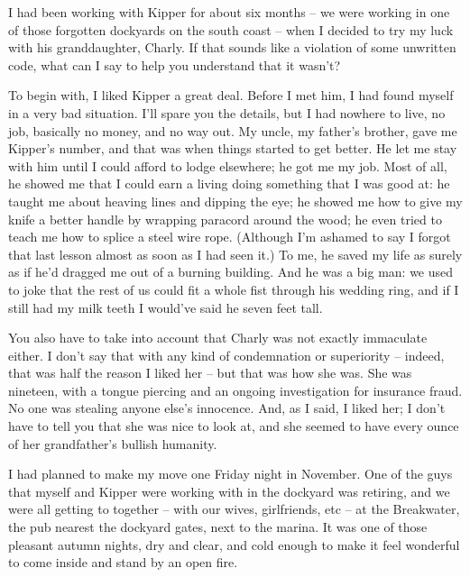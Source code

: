 

I had been working with Kipper for about six months -- we were working in one of those forgotten dockyards on the south coast -- when I decided to try my luck with his granddaughter, Charly. If that sounds like a violation of some unwritten code, what can I say to help you understand that it wasn't?

To begin with, I liked Kipper a great deal. Before I met him, I had found myself in a very bad situation. I'll spare you the details, but I had nowhere to live, no job, basically no money, and no way out. My uncle, my father's brother, gave me Kipper's number, and that was when things started to get better. He let me stay with him until I could afford to lodge elsewhere; he got me my job. Most of all, he showed me that I could earn a living doing something that I was good at: he taught me about heaving lines and dipping the eye; he showed me how to give my knife a better handle by wrapping paracord around the wood; he even tried to teach me how to splice a steel wire rope. (Although I'm ashamed to say I forgot that last lesson almost as soon as I had seen it.) To me, he saved my life as surely as if he'd dragged me out of a burning building. And he was a big man: we used to joke that the rest of us could fit a whole fist through his wedding ring, and if I still had my milk teeth I would've said he seven feet tall.

You also have to take into account that Charly was not exactly immaculate either. I don't say that with any kind of condemnation or superiority -- indeed, that was half the reason I liked her -- but that was how she was. She was nineteen, with a tongue piercing and an ongoing investigation for insurance fraud. No one was stealing anyone else's innocence. And, as I said, I liked her; I don't have to tell you that she was nice to look at, and she seemed to have every ounce of her grandfather's bullish humanity.

\divsep

I had planned to make my move one Friday night in November. One of the guys that myself and Kipper were working with in the dockyard was retiring, and we were all getting to together -- with our wives, girlfriends, etc -- at the Breakwater, the pub nearest the dockyard gates, next to the marina. It was one of those pleasant autumn nights, dry and clear, and cold enough to make it feel wonderful to come inside and stand by an open fire.

